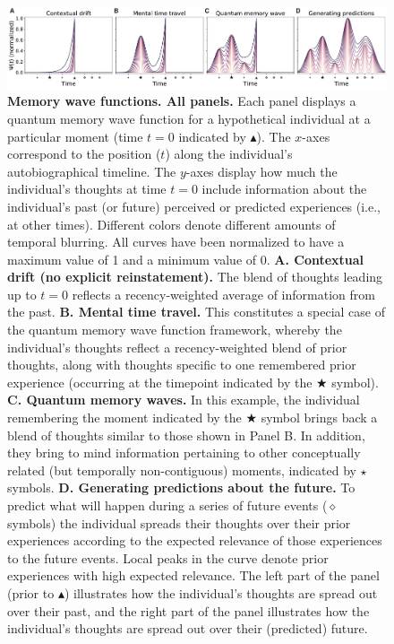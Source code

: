 \documentclass{article}
\begin{document}
\begin{figure}[tp] \centering \includegraphics[width=\textwidth]{figs/wave_functions}
  \caption{\textbf{Memory wave functions. All panels.} Each panel displays a quantum memory wave function for a hypothetical individual at a particular moment (time $t=0$ indicated by $\blacktriangle$).  The $x$-axes correspond to the position ($t$) along the individual's autobiographical timeline.  The $y$-axes display how much the individual's thoughts at time $t = 0$ include information about the individual's past (or future) perceived or predicted experiences (i.e., at other times). Different colors denote different amounts of temporal blurring.  All curves have been normalized to have a maximum value of 1 and a minimum value of 0.  \textbf{A. Contextual drift (no explicit reinstatement).}  The blend of thoughts leading up to $t = 0$ reflects a recency-weighted average of information from the past.  \textbf{B. Mental time travel.} This constitutes a special case of the quantum memory wave function framework, whereby the individual's thoughts reflect a recency-weighted blend of prior thoughts, along with thoughts specific to one remembered prior experience (occurring at the timepoint indicated by the $\bigstar$ symbol).  \textbf{C. Quantum memory waves.}  In this example, the individual remembering the moment indicated by the $\bigstar$ symbol brings back a blend of thoughts similar to those shown in Panel B.  In addition, they bring to mind information pertaining to other conceptually related (but temporally non-contiguous) moments, indicated by $\star$ symbols. \textbf{D. Generating predictions about the future.} To predict what will happen during a series of future events ($\diamond$ symbols) the individual spreads their thoughts over their prior experiences according to the expected relevance of those experiences to the future events.  Local peaks in the curve denote prior experiences with high expected relevance.  The left part of the panel (prior to $\blacktriangle$) illustrates how the individual's thoughts are spread out over their past, and the right part of the panel illustrates how the individual's thoughts are spread out over their (predicted) future.}
\label{fig:qwave}
\end{figure}
\end{document}
